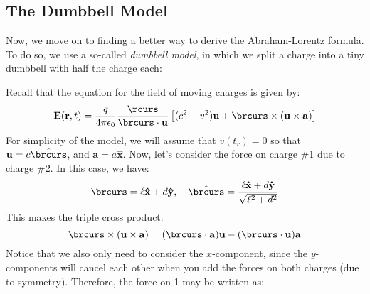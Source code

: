 \subsection{The Dumbbell Model}
Now, we move on to finding a better way to derive the Abraham-Lorentz formula. To do so, we use a so-called
\textit{dumbbell model}, in which we split a charge into a tiny dumbbell with half the charge each:  
\begin{center}
\end{center}
Recall that the equation for the field of moving charges is given by:
\[
	\mathbf{E}(\mathbf{r}, t) = \frac{q}{4\pi \epsilon_0} \frac{\rcurs}{\brcurs \cdot \mathbf{u}} \left[ (c^2
	- v^2) \mathbf{u} + \brcurs \times (\mathbf{u} \times \mathbf{a}) \right]
\]
For simplicity of the model, we will assume that \( v(t_r) = 0  \) so that \( \mathbf{u} = c \hat{\brcurs}
\), and \( \mathbf{a} = a \mathbf{\hat{x}} \). 
Now, let's consider the force on charge \#1 due to charge \#2. In this case, we have:
\[
	\brcurs = \ell \mathbf{\hat{x}} + d \mathbf{\hat{y}}, \quad \hat{\brcurs} = \frac{\ell \mathbf{\hat{x}} +
	d \mathbf{\hat{y}}}{\sqrt{\ell^2 + d^2}}
\]
This makes the triple cross product:
\[
	\brcurs \times (\mathbf{u} \times \mathbf{a}) = (\brcurs \cdot \mathbf{a}) \mathbf{u} - (\brcurs \cdot
	\mathbf{u}) \mathbf{a}
\]
Notice that we also only need to consider the \( x \)-component, since the \( y \)-components will cancel
each other when you add the forces on both charges (due to symmetry). Therefore, the force on 1 may be
written as:
